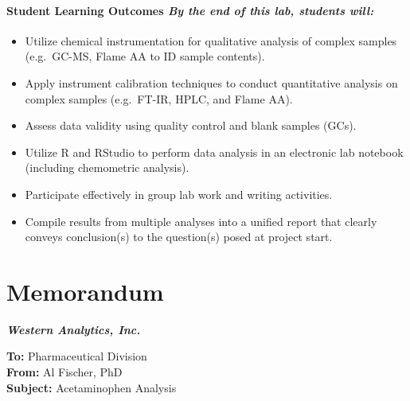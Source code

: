 \documentclass[]{tufte-book}
\providecommand{\tightlist}{%
  \setlength{\itemsep}{0pt}\setlength{\parskip}{0pt}}
\begin{document}
\hypertarget{student-learning-outcomes-by-the-end-of-this-lab-students-will}{%
\paragraph{\texorpdfstring{\textbf{Student Learning Outcomes} \textbar{} \emph{By the end of this lab, students will:}}{Student Learning Outcomes \textbar{} By the end of this lab, students will:}}\label{student-learning-outcomes-by-the-end-of-this-lab-students-will}}

\begin{itemize}
\tightlist
\item
  Utilize chemical instrumentation for qualitative analysis of complex samples (e.g.~GC-MS, Flame AA to ID sample contents).\\
\item
  Apply instrument calibration techniques to conduct quantitative analysis on complex samples (e.g.~FT-IR, HPLC, and Flame AA).\\
\item
  Assess data validity using quality control and blank samples (GCs).\\
\item
  Utilize R and RStudio to perform data analysis in an electronic lab notebook (including chemometric analysis).\\
\item
  Participate effectively in group lab work and writing activities.\\
\item
  Compile results from multiple analyses into a unified report that clearly conveys conclusion(s) to the question(s) posed at project start.
\end{itemize}

\newpage

\hypertarget{am-memo}{%
\section*{Memorandum}\label{am-memo}}

\noindent
\textbf{\emph{Western Analytics, Inc.}}

\noindent  
\textbf{To:} Pharmaceutical Division\\
\noindent  
\textbf{From:} Al Fischer, PhD\\
\noindent  
\textbf{Subject:} Acetaminophen Analysis
\end{document}
